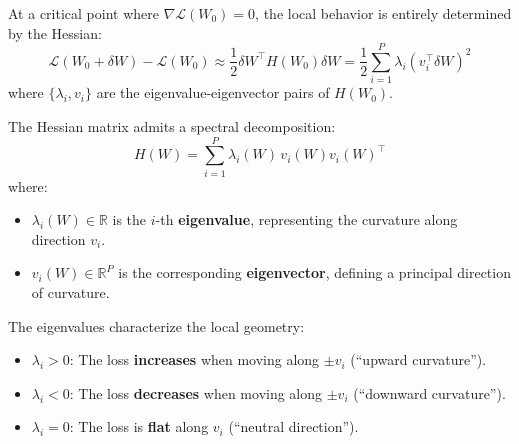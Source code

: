 \documentclass[
  journal=largetwo,
  simfonts=false,
  year=2025,
  volume=37,
]{cup-journal}
\begin{document}
At a critical point where $\nabla \mathcal{L}(W_0) = 0$, the local behavior is entirely determined by the Hessian:
\begin{equation}
    \mathcal{L}(W_0 + \delta W) - \mathcal{L}(W_0) \approx \frac{1}{2} \delta W^\top H(W_0) \delta W = \frac{1}{2} \sum_{i=1}^{P} \lambda_i (v_i^\top \delta W)^2
\end{equation}
where $\{\lambda_i, v_i\}$ are the eigenvalue-eigenvector pairs of $H(W_0)$.

\begin{definition}\label{def:hessian_eigen}
The Hessian matrix admits a spectral decomposition:
\begin{equation}
    H(W) = \sum_{i=1}^{P} \lambda_i(W) \, v_i(W) v_i(W)^\top
\end{equation}
where:
\begin{itemize}
    \item $\lambda_i(W) \in \mathbb{R}$ is the $i$-th \textbf{eigenvalue}, representing the curvature along direction $v_i$.
    \item $v_i(W) \in \mathbb{R}^P$ is the corresponding \textbf{eigenvector}, defining a principal direction of curvature.
\end{itemize}

The eigenvalues characterize the local geometry:
\begin{itemize}
    \item $\lambda_i > 0$: The loss \textbf{increases} when moving along $\pm v_i$ (``upward curvature'').
    \item $\lambda_i < 0$: The loss \textbf{decreases} when moving along $\pm v_i$ (``downward curvature'').
    \item $\lambda_i = 0$: The loss is \textbf{flat} along $v_i$ (``neutral direction'').
\end{itemize}
\end{definition}
\end{document}

